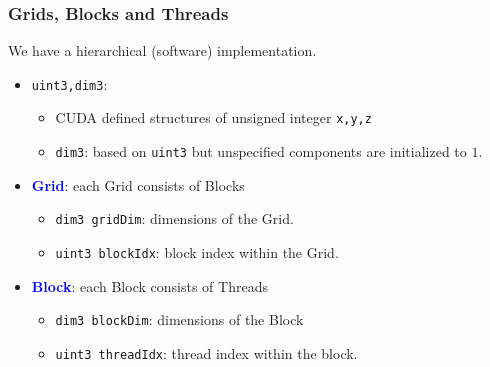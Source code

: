 \begin{frame}
     \frametitle{Grids, Blocks and Threads}
        We have a hierarchical (software) implementation.
     \begin{itemize}
        \item \lstinline[style=MyCudaStyle]|uint3,dim3|:
           \begin{itemize}
              \item CUDA defined structures of unsigned integer \lstinline[style=MyCudaStyle]|x,y,z|
              \item \lstinline[style=MyCudaStyle]|dim3|: based on \lstinline[style=MyCudaStyle]|uint3|
                    but unspecified components are initialized to $1$.
           \end{itemize}
        \item \textbf{\textcolor{blue}{Grid}}: each Grid consists of Blocks
           \begin{itemize}
              \item \lstinline[style=MyCudaStyle]|dim3 gridDim|: dimensions of the Grid.
              \item \lstinline[style=MyCudaStyle]|uint3 blockIdx|: block index within the Grid.
           \end{itemize}
        \item \textbf{\textcolor{blue}{Block}}: each Block consists of Threads
           \begin{itemize}
              \item \lstinline[style=MyCudaStyle]|dim3 blockDim|: dimensions of the Block
              \item \lstinline[style=MyCudaStyle]|uint3 threadIdx|: thread index within the block.
           \end{itemize}
     \end{itemize}
\end{frame}

